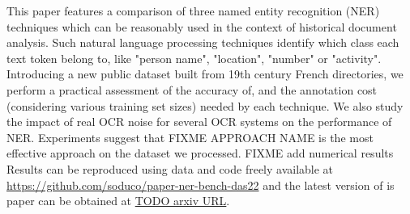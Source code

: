 This paper features a comparison of three named entity recognition (NER) techniques which can be reasonably used in the context of historical document analysis.
Such natural language processing techniques identify which class each text token belong to, like "person name", "location", "number" or "activity".
Introducing a new public dataset built from 19th century French directories, 
we perform a practical assessment of the accuracy of, and the annotation cost (considering various training set sizes) needed by each technique.
We also study the impact of real OCR noise for several OCR systems on the performance of NER.
Experiments suggest that FIXME APPROACH NAME is the most effective approach on the dataset we processed.
FIXME add numerical results
Results can be reproduced using data and code freely available at \url{https://github.com/soduco/paper-ner-bench-das22}
and the latest version of is paper can be obtained at \url{TODO arxiv URL}.